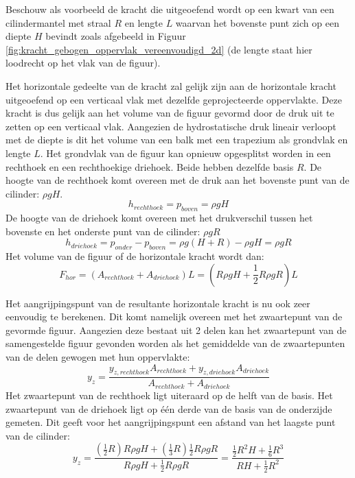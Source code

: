 Beschouw als voorbeeld de kracht die uitgeoefend wordt op een kwart van een cilindermantel met straal $R$ en lengte $L$ waarvan het bovenste punt zich op een diepte $H$ bevindt zoals afgebeeld in Figuur \ref{fig:kracht_gebogen_oppervlak_vereenvoudigd_2d} (de lengte staat hier loodrecht op het vlak van de figuur).

Het horizontale gedeelte van de kracht zal gelijk zijn aan de horizontale kracht uitgeoefend op een verticaal vlak met dezelfde geprojecteerde oppervlakte. Deze kracht is dus gelijk aan het volume van de figuur gevormd door de druk uit te zetten op een verticaal vlak. Aangezien de hydrostatische druk lineair verloopt met de diepte is dit het volume van een balk met een trapezium als grondvlak en lengte $L$. Het grondvlak van de figuur kan opnieuw opgesplitst worden in een rechthoek en een rechthoekige driehoek. Beide hebben dezelfde basis $R$. De hoogte van de rechthoek komt overeen met de druk aan het bovenste punt van de cilinder: $\rho g H$.
\begin{equation}
	h_{rechthoek} = p_{boven} = \rho g H
\end{equation}
De hoogte van de driehoek komt overeen met het drukverschil tussen het bovenste en het onderste punt van de cilinder: $\rho g R$
\begin{equation}
	h_{driehoek} = p_{onder}-p_{boven} = \rho g (H+R) - \rho g H =  \rho g R
\end{equation}
Het volume van de figuur of de horizontale kracht wordt dan:
\begin{equation}
	F_{hor} = (A_{rechthoek} + A_{driehoek}) L = (R \rho g H + \frac{1}{2} R \rho g R) L
\end{equation}

Het aangrijpingspunt van de resultante horizontale kracht is nu ook zeer eenvoudig te berekenen. Dit komt namelijk overeen met het zwaartepunt van de gevormde figuur. Aangezien deze bestaat uit 2 delen kan het zwaartepunt van de samengestelde figuur gevonden worden als het gemiddelde van de zwaartepunten van de delen gewogen met hun oppervlakte:
\begin{equation}
	y_z = \frac{y_{z,rechthoek} A_{rechthoek} + y_{z,driehoek} A_{driehoek}}{A_{rechthoek} + A_{driehoek}}
\end{equation}
Het zwaartepunt van de rechthoek ligt uiteraard op de helft van de basis. Het zwaartepunt van de driehoek ligt op één derde van de basis van de onderzijde gemeten. Dit geeft voor het aangrijpingspunt een afstand van het laagste punt van de cilinder:
\begin{equation}
	y_z = \frac{(\frac{1}{2} R)  R \rho g H + (\frac{1}{3} R) \frac{1}{2} R \rho g R}{R \rho g H + \frac{1}{2} R \rho g R} = \frac{\frac{1}{2} R^2 H + \frac{1}{6} R^3}{R H + \frac{1}{2} R^2}
\end{equation}

